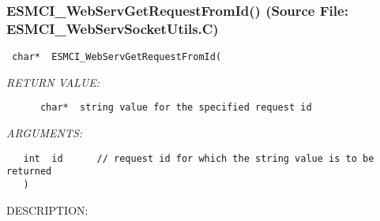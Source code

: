  
\setlength{\oldparskip}{\parskip}
\setlength{\parskip}{1.5ex}
\setlength{\oldparindent}{\parindent}
\setlength{\parindent}{0pt}
\setlength{\oldbaselineskip}{\baselineskip}
\setlength{\baselineskip}{11pt}
 
\def\bv{\begin{verbatim}}
\def\ev{\end{verbatim}}
\def\be{\begin{equation}}
\def\ee{\end{equation}}
\def\bea{\begin{eqnarray}}
\def\eea{\end{eqnarray}}
\def\bi{\begin{itemize}}
\def\ei{\end{itemize}}
\def\bn{\begin{enumerate}}
\def\en{\end{enumerate}}
\def\bd{\begin{description}}
\def\ed{\end{description}}
\def\({\left (}
\def\){\right )}
\def\[{\left [}
\def\]{\right ]}
\def\<{\left  \langle}
\def\>{\right \rangle}
\def\cI{{\cal I}}
\def\diag{\mathop{\rm diag}}
\def\tr{\mathop{\rm tr}}


 
\subsubsection{ESMCI\_WebServGetRequestFromId() (Source File: ESMCI\_WebServSocketUtils.C)}


  
\begin{verbatim} char*  ESMCI_WebServGetRequestFromId(\end{verbatim}{\em RETURN VALUE:}
\begin{verbatim}      char*  string value for the specified request id\end{verbatim}{\em ARGUMENTS:}
\begin{verbatim}   int  id      // request id for which the string value is to be returned
   )\end{verbatim}
{\sf DESCRIPTION:\\ }


